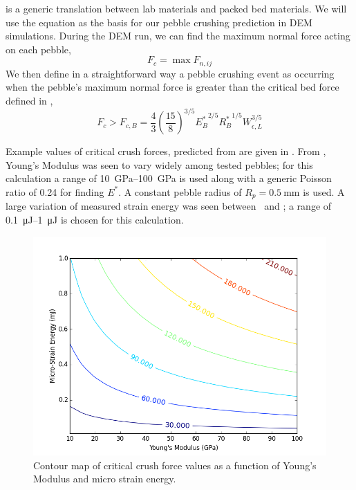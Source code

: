  is a generic translation between lab materials and packed bed materials. We will use the equation as the basis for our pebble crushing prediction in DEM simulations. During the DEM run, we can find the maximum normal force acting on each pebble,
\begin{equation}\label{eq:find_fmax}
	F_{c} = \max F_{n,ij}
\end{equation}
We then define in a straightforward way a pebble crushing event as occurring when the pebble's maximum normal force is greater than the critical bed force defined in ,
\begin{equation}\label{eq:crush-predict}
  F_{c} > F_{c,B} = \frac{4}{3}\left(\frac{15}{8}\right)^{3/5}{E_B^*}^{2/5}{R_B^*}^{1/5}W_{\epsilon,L}^{3/5}
\end{equation}

Example values of critical crush forces, predicted from  are given in . From , Young's Modulus was seen to vary widely among tested pebbles; for this calculation a range of \SIrange{10}{100}{\giga\pascal} is used along with a generic Poisson ratio of \num{0.24} for finding $E^*$. A constant pebble radius of $R_p = \SI{0.5}{\milli\meter}$ is used. A large variation of measured strain energy was seen between \lis~and \lit; a range of \SIrange{0.1}{1}{\micro\joule} is chosen for this calculation.

\begin{figure}[ht]
\centering
    \includegraphics[width=\doubleimagewidth]{figures/crush-force-contours.png}
    \caption{Contour map of critical crush force values as a function of Young's Modulus and micro strain energy.}
    \label{fig:crush-force-contours}
\end{figure}

